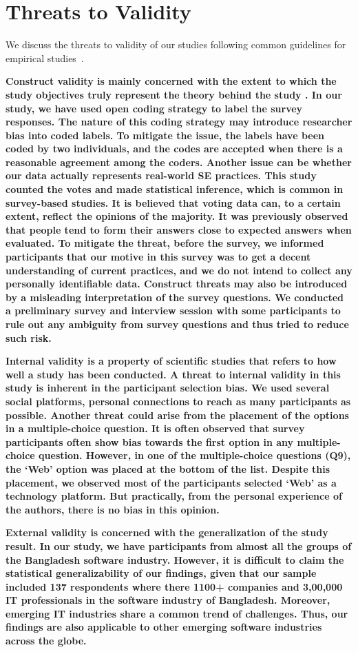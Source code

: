 \section{Threats to Validity}
\label{validity}
We discuss the threats to validity of our studies following common guidelines
for empirical studies~\citep{Woh00}.

\bf{Construct validity} is mainly concerned with the extent to which the
study objectives truly represent the theory behind the study \citep{Wohlin2012}. In our study, we have used open coding strategy to label the survey responses. The nature of this coding strategy may introduce researcher bias into coded labels. To mitigate the issue, the labels have been coded by two individuals, and the codes are accepted when there is a reasonable agreement among the coders. Another issue can be whether our data actually represents real-world SE practices. This study counted the votes and made statistical inference, which is common in survey-based studies. It is believed that voting data can, to a certain extent, reflect the opinions of the majority. It was previously observed\citep{Garousi2015} that people tend to form their answers close to expected answers when evaluated. To mitigate the threat, before the survey, we informed participants that our motive in this survey was to get a decent understanding of current practices, and we do not intend to collect any personally identifiable data. Construct threats may also be introduced by a misleading interpretation of the survey questions. We conducted a preliminary survey and interview session with some participants to rule out any ambiguity from survey questions and thus tried to reduce such risk.

\bf{Internal validity} is a property of scientific studies that refers to how well a study has been conducted. A threat to internal validity in this study is inherent in the participant selection bias. We used several social platforms, personal connections to reach as many participants as possible. Another threat could arise from the placement of the options in a multiple-choice question. It is often observed that survey participants often show bias towards the first option in any multiple-choice question\citep{Uddin2019}. However, in one of the multiple-choice questions (Q9), the `Web' option was placed at the bottom of the list. Despite this placement, we observed most of the participants selected `Web' as a technology platform. But practically, from the personal experience of the authors, there is no bias in this opinion.

\bf{External validity} is concerned with the generalization of the study result. In our study, we have participants from almost all the groups of the Bangladesh software industry. However, it is difficult to claim the statistical generalizability of our findings, given that our sample included 137 respondents where there 1100+ companies and 3,00,000 IT professionals\citep{BASIS2018} in the software industry of Bangladesh. Moreover, emerging IT industries share a common trend of challenges\citep{Sison2006, lloyd2020}. Thus, our findings are also applicable to other emerging software industries across the globe.